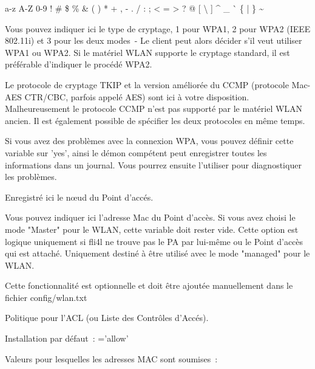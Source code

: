 \begin{description}
      a-z A-Z 0-9 ! \# \$ \% \& ( ) * + , - . / : ; {\textless} = {\textgreater} ? @ [ {\textbackslash} ] \^{} \_ \`{} \{ | \} {\textasciitilde}


      Vous pouvez indiquer ici le type de cryptage, 1 pour WPA1, 2 pour WPA2
      (IEEE 802.11i) et 3 pour les deux modes~- Le client peut alors décider s'il
      veut utiliser WPA1 ou WPA2. Si le matériel WLAN supporte le cryptage
      standard, il est préférable d'indiquer le procédé WPA2.


      Le protocole de cryptage TKIP et la version améliorée du CCMP (protocole
      Mac-AES CTR/CBC, parfois appelé AES) sont ici à votre disposition.
      Malheureusement le protocole CCMP n'est pas supporté par le matériel WLAN
      ancien. Il est également possible de spécifier les deux protocoles
      en même temps.


      Si vous avez des problèmes avec la connexion WPA, vous pouvez définir
      cette variable sur 'yes', ainsi le démon compétent peut enregistrer toutes
      les informations dans un journal. Vous pourrez ensuite l'utiliser pour
      diagnostiquer les problèmes.


      Enregistré ici le n\oe{}ud du Point d'accés.

      Vous pouvez indiquer ici l'adresse Mac du Point d'accès. Si vous avez
      choisi le mode "Master" pour le WLAN, cette variable doit rester vide.
      Cette option est logique uniquement si fli4l ne trouve pas le PA par
      lui-même ou le Point d'accès qui est attaché. Uniquement destiné à être
      utilisé avec le mode "managed" pour le WLAN.

      Cette fonctionnalité est optionnelle et doit être ajoutée manuellement
      dans le fichier config/wlan.txt


      Politique pour l'ACL (ou Liste des Contrôles d'Accés).

      Installation par défaut~: ='allow'

      Valeurs pour lesquelles les adresses MAC sont soumises~:


\end{description}
